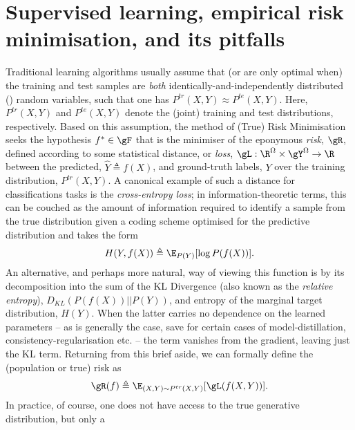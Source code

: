 \section{Supervised learning, empirical risk minimisation, and its pitfalls}\label{sec:erm}
%
Traditional learning algorithms usually assume  that (or are only optimal when) the training and
test samples are \emph{both} identically-and-independently distributed (\iid{}) random variables,
such that one has \( P^{tr}(X, Y) \approx P^{te}(X, Y) \). 
%
Here, \( P^{tr}(X, Y) \) and \( P^{te}(X, Y) \) denote the (joint) training and test distributions,
respectively.
%
Based on this assumption, the method of (True) Risk Minimisation seeks the hypothesis \( f^\ast \in
\gF \) that is the minimiser of the eponymous \emph{risk}, $\gR$, defined according to some
statistical distance, or \emph{loss}, \( \gL: \R^\Omega \times \gY^\Omega \to \R \) between the
predicted, \(\hat{Y} \triangleq f(X) \), and ground-truth labels, \(Y\) over the training
distribution, \(P^{tr}(X, Y)\). 
%
A canonical example of such a distance for classifications tasks is the \emph{cross-entropy loss};
in information-theoretic terms, this can be couched as the amount of information required to
identify a sample from the true distribution given a coding scheme optimised for the predictive
distribution and takes the form
%
\begin{equation}
    H(Y, f(X)) \triangleq \E_{P(Y)}[ \log P(f(X)) ].
\end{equation}
%
An alternative, and perhaps more natural, way of viewing this function is by its decomposition into
the sum of the \ac{KL} Divergence (also known as the \emph{relative entropy}),
\(D_{KL}(P(f(X))||P(Y))\), and entropy of the marginal target distribution, \(H(Y)\). 
%
When the latter carries no dependence on the learned parameters -- as is generally the case, save
for certain cases of model-distillation, consistency-regularisation etc. -- the term vanishes from
the gradient, leaving just the \acs{KL} term.
%
Returning from this brief aside, we can formally define the (population or true) risk as
%
\begin{equation}\label{eq:pop_risk} 
    \gR (f) \triangleq \E_{ (X, Y) \sim P^{tr}(X, Y) } [ \gL ( f(X, Y) )].
\end{equation}
%
In practice, of course, one does not have access to the true generative distribution, but only a
